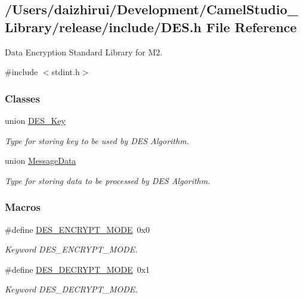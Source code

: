 \hypertarget{a00005}{}\subsection{/\+Users/daizhirui/\+Development/\+Camel\+Studio\+\_\+\+Library/release/include/\+D\+ES.h File Reference}
\label{a00005}


Data Encryption Standard Library for M2.  


{\ttfamily \#include $<$stdint.\+h$>$}\newline
\subsubsection*{Classes}
\begin{DoxyCompactItemize}
\item 
union \mbox{\hyperlink{a00134}{D\+E\+S\+\_\+\+Key}}
\begin{DoxyCompactList}\small\item\em Type for storing key to be used by D\+ES Algorithm. \end{DoxyCompactList}\item 
union \mbox{\hyperlink{a00138}{Message\+Data}}
\begin{DoxyCompactList}\small\item\em Type for storing data to be processed by D\+ES Algorithm. \end{DoxyCompactList}\end{DoxyCompactItemize}
\subsubsection*{Macros}
\begin{DoxyCompactItemize}
\item 
\mbox{\label{a00005_a73b9a4e1e36c14eb7a44556ee767f106}} 
\#define \mbox{\hyperlink{a00005_a73b9a4e1e36c14eb7a44556ee767f106}{D\+E\+S\+\_\+\+E\+N\+C\+R\+Y\+P\+T\+\_\+\+M\+O\+DE}}~0x0
\begin{DoxyCompactList}\small\item\em Keyword D\+E\+S\+\_\+\+E\+N\+C\+R\+Y\+P\+T\+\_\+\+M\+O\+DE. \end{DoxyCompactList}\item 
\mbox{\label{a00005_a874730b46afa0dd86cf7e3f60bd51165}} 
\#define \mbox{\hyperlink{a00005_a874730b46afa0dd86cf7e3f60bd51165}{D\+E\+S\+\_\+\+D\+E\+C\+R\+Y\+P\+T\+\_\+\+M\+O\+DE}}~0x1
\begin{DoxyCompactList}\small\item\em Keyword D\+E\+S\+\_\+\+D\+E\+C\+R\+Y\+P\+T\+\_\+\+M\+O\+DE. \end{DoxyCompactList}\end{DoxyCompactItemize}
